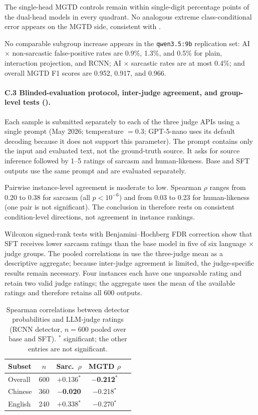 The single-head MGTD controls remain within single-digit percentage points of the dual-head models in every quadrant. No analogous extreme class-conditional error appears on the MGTD side, consistent with .

No comparable subgroup increase appears in the \texttt{qwen3.5:9b} replication set: AI $\times$ non-sarcastic false-positive rates are 0.9\%, 1.3\%, and 0.5\% for plain, interaction projection, and RCNN; AI $\times$ sarcastic rates are at most 0.4\%; and overall MGTD F1 scores are 0.952, 0.917, and 0.966.

\label{app:c3}\paragraph{C.3 Blinded-evaluation protocol, inter-judge agreement, and group-level tests ().} Each sample is submitted separately to each of the three judge APIs using a single prompt (May 2026; temperature $= 0.3$; GPT-5-nano uses its default decoding because it does not support this parameter). The prompt contains only the input and evaluated text, not the ground-truth source. It asks for source inference followed by 1--5 ratings of sarcasm and human-likeness. Base and SFT outputs use the same prompt and are evaluated separately.

Pairwise instance-level agreement is moderate to low. Spearman $\rho$ ranges from 0.20 to 0.38 for sarcasm (all $p < 10^{-6}$) and from 0.03 to 0.23 for human-likeness (one pair is not significant). The conclusion in  therefore rests on consistent condition-level directions, not agreement in instance rankings.

Wilcoxon signed-rank tests with Benjamini--Hochberg FDR correction \citep{benjamini1995fdr} show that SFT receives lower sarcasm ratings than the base model in five of six language $\times$ judge groups. The pooled correlations in  use the three-judge mean as a descriptive aggregate; because inter-judge agreement is limited, the judge-specific results remain necessary. Four instances each have one unparsable rating and retain two valid judge ratings; the aggregate uses the mean of the available ratings and therefore retains all 600 outputs.

\begin{table}[h]
  \centering
  \small
  \begin{tabular}{@{}lcccc@{}}
    \toprule
    \textbf{Subset} & \textbf{$n$} & \textbf{Sarc.\ $\rho$} & \textbf{MGTD $\rho$} \\
    \midrule
    Overall & 600 & $+$0.136$^{*}$ & \textbf{$-$0.212}$^{*}$ \\
    Chinese & 360 & \textbf{$-$0.020} & $-$0.218$^{*}$ \\
    English & 240 & $+$0.338$^{*}$ & $-$0.270$^{*}$ \\
    \bottomrule
  \end{tabular}
  \caption{Spearman correlations between detector probabilities and LLM-judge ratings (RCNN detector, $n = 600$ pooled over base and SFT). $^{*}$ significant; the other entries are not significant.}
  \label{tab:correlation}
\end{table}

